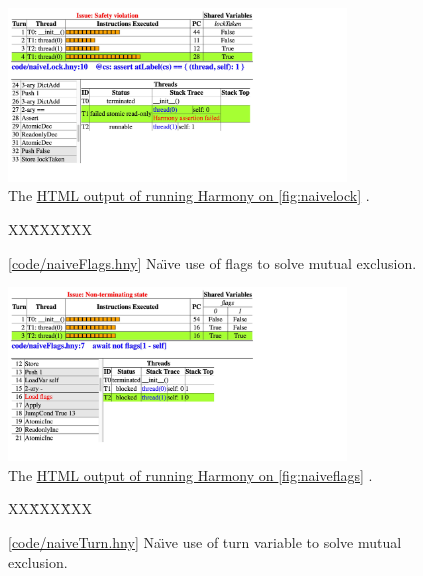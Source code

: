 \documentclass{report}
\newcommand{\harmonysource}[1]{
\begin{tabbing}
XX\=XXX\=XXX\kill
    
\end{tabbing}
}
\newcommand{\harmonylink}[1]{%
[\href{https://harmony.cs.cornell.edu/#1}{\underline{#1}}]%
}
\newcommand{\harmonyref}[2]{%
\href{https://harmony.cs.cornell.edu/output/#1}{\underline{#2}}%
}
\newenvironment{code}{
\tcolorbox
}{
\endtcolorbox
}
\begin{document}
\begin{figure}
\begin{center}
\includegraphics[width=0.8\textwidth]{figures/naiveLock.pdf}
\end{center}
\caption{The \harmonyref{naiveLock.html}{HTML output of running Harmony on \autoref{fig:naivelock}}.}
\label{fig:naiveLockhtml}
\end{figure}

\begin{figure}
\begin{code}
\harmonysource{naiveFlags}
\end{code}
\caption{\harmonylink{code/naiveFlags.hny} Na\"{\i}ve use of flags to solve mutual exclusion.}
\label{fig:naiveflags}
\end{figure}

\begin{figure}
\begin{center}
\includegraphics[width=0.8\textwidth]{figures/naiveFlags.pdf}
\end{center}
\caption{The \harmonyref{naiveFlags.html}{HTML output of running Harmony on \autoref{fig:naiveflags}}.}
\label{fig:naiveflagshtml}
\end{figure}

\begin{figure}
\begin{code}
\harmonysource{naiveTurn}
\end{code}
\caption{\harmonylink{code/naiveTurn.hny} Na\"{\i}ve use of turn variable to solve mutual exclusion.}
\label{fig:naiveturn}
\end{figure}
\end{document}
